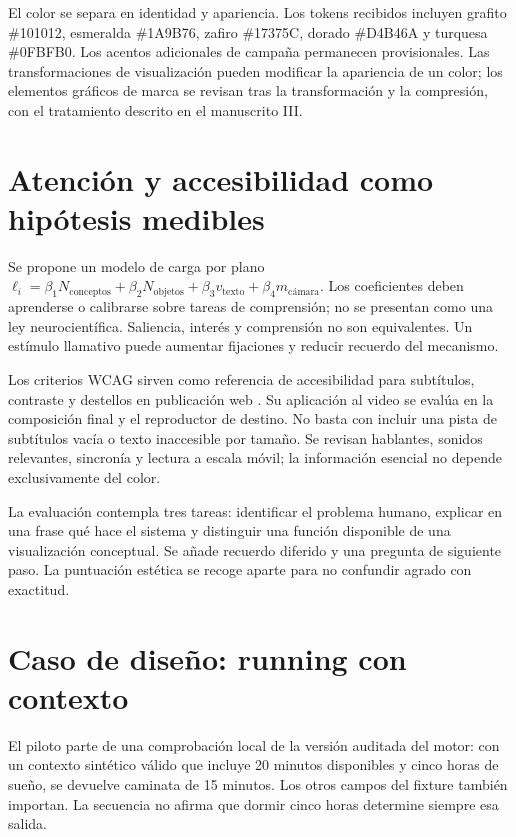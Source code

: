 El color se separa en identidad y apariencia. Los tokens recibidos incluyen grafito \#101012, esmeralda \#1A9B76, zafiro \#17375C, dorado \#D4B46A y turquesa \#0FBFB0. Los acentos adicionales de campaña permanecen provisionales. Las transformaciones de visualización pueden modificar la apariencia de un color; los elementos gráficos de marca se revisan tras la transformación y la compresión, con el tratamiento descrito en el manuscrito III.

\section{Atención y accesibilidad como hipótesis medibles}
Se propone un modelo de carga por plano $\ell_i=\beta_1N_{\mathrm{conceptos}}+\beta_2N_{\mathrm{objetos}}+\beta_3v_{\mathrm{texto}}+\beta_4m_{\mathrm{cámara}}$. Los coeficientes deben aprenderse o calibrarse sobre tareas de comprensión; no se presentan como una ley neurocientífica. Saliencia, interés y comprensión no son equivalentes. Un estímulo llamativo puede aumentar fijaciones y reducir recuerdo del mecanismo.

Los criterios WCAG sirven como referencia de accesibilidad para subtítulos, contraste y destellos en publicación web \cite{wcag}. Su aplicación al video se evalúa en la composición final y el reproductor de destino. No basta con incluir una pista de subtítulos vacía o texto inaccesible por tamaño. Se revisan hablantes, sonidos relevantes, sincronía y lectura a escala móvil; la información esencial no depende exclusivamente del color.

La evaluación contempla tres tareas: identificar el problema humano, explicar en una frase qué hace el sistema y distinguir una función disponible de una visualización conceptual. Se añade recuerdo diferido y una pregunta de siguiente paso. La puntuación estética se recoge aparte para no confundir agrado con exactitud.

\section{Caso de diseño: running con contexto}
El piloto parte de una comprobación local de la versión auditada del motor: con un contexto sintético válido que incluye 20 minutos disponibles y cinco horas de sueño, se devuelve caminata de 15 minutos. Los otros campos del fixture también importan. La secuencia no afirma que dormir cinco horas determine siempre esa salida.

